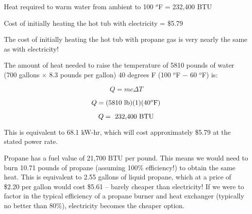 \vskip 10pt

Heat required to warm water from ambient to 100 $^{o}$F = 232,400 BTU

\vskip 10pt

Cost of initially heating the hot tub with electricity = \$5.79

\vskip 10pt

The cost of initially heating the hot tub with propane gas is very nearly the same as with electricity!







The amount of heat needed to raise the temperature of 5810 pounds of water (700 gallons $\times$ 8.3 pounds per gallon) 40 degrees F (100 $^{o}$F $-$ 60 $^{o}$F) is:

$$Q = mc \Delta T$$

$$Q = (5810 \hbox{ lb})(1)(40^o \hbox{F}) $$

$$Q = \hbox{ 232,400 BTU}$$

This is equivalent to 68.1 kW-hr, which will cost approximately \$5.79 at the stated power rate.

\vskip 10pt

Propane has a fuel value of 21,700 BTU per pound.  This means we would need to burn 10.71 pounds of propane (assuming 100\% efficiency!) to obtain the same heat.  This is equivalent to 2.55 gallons of liquid propane, which at a price of \$2.20 per gallon would cost \$5.61 -- barely cheaper than electricity!  If we were to factor in the typical efficiency of a propane burner and heat exchanger (typically no better than 80\%), electricity becomes the cheaper option.




